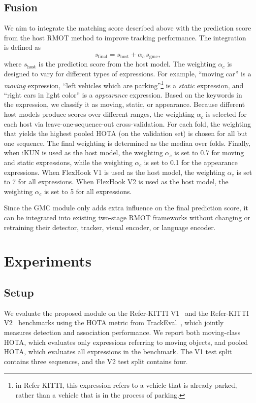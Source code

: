 \documentclass{article}
\begin{document}
\subsection{Fusion}
\label{sec:fusion}
We aim to integrate the matching score described above with the prediction score from the host RMOT method to improve tracking performance. The integration is defined as 
\begin{equation}
  s_{\mathrm{final}} = s_{\mathrm{host}} + \alpha_{c}\,s_{\mathrm{gmc}},
  \label{eq:fusion}
\end{equation}
where $s_{\mathrm{host}}$ is the prediction score from the host model. The weighting $\alpha_c$ is designed to vary for different types of expressions. For example, \enquote{moving car} is a \emph{moving} expression, \enquote{left vehicles which are parking}\footnote{in Refer-KITTI, this expression refers to a vehicle that is already parked, rather than a vehicle that is in the process of parking.} is a \emph{static} expression, and \enquote{right cars in light color} is a \emph{appearance} expression. Based on the keywords in the expression, we classify it as moving, static, or appearance. Because different host models produce scores over different ranges, the weighting $\alpha_c$ is selected for each host via leave-one-sequence-out cross-validation. For each fold, the weighting that yields the highest pooled HOTA (on the validation set) is chosen for all but one sequence. The final weighting is determined as the median over folds. Finally, when iKUN is used as the host model, the weighting $\alpha_c$ is set to 0.7 for moving and static expressions, while the weighting $\alpha_c$ is set to 0.1 for the appearance expressions. When FlexHook V1 is used as the host model, the weighting $\alpha_c$ is set to 7 for all expressions. When FlexHook V2 is used as the host model, the weighting $\alpha_c$ is set to 5 for all expressions. 

Since the GMC module only adds extra influence on the final prediction score, it can be integrated into existing two-stage RMOT frameworks without changing or retraining their detector, tracker, visual encoder, or language encoder.

\section{Experiments}
\label{sec:exp}

\subsection{Setup}
\label{sec:setup}
We evaluate the proposed module on the Refer-KITTI V1~\cite{transrmot} and the Refer-KITTI V2~\cite{temprmot} benchmarks using the HOTA metric from TrackEval~\cite{hota}, which jointly measures detection and association performance. We report both moving-class HOTA, which evaluates only expressions referring to moving objects, and pooled HOTA, which evaluates all expressions in the benchmark. The V1 test split contains three sequences, and the V2 test split contains four.
\end{document}
